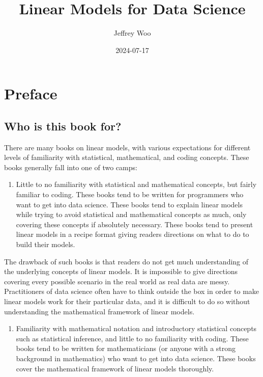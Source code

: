 \documentclass[
]{book}
\title{Linear Models for Data Science}
\author{Jeffrey Woo}
\date{2024-07-17}
\providecommand{\tightlist}{%
  \setlength{\itemsep}{0pt}\setlength{\parskip}{0pt}}
\begin{document}
\maketitle

{
\setcounter{tocdepth}{1}
\tableofcontents
}
\hypertarget{preface}{%
\chapter*{Preface}\label{preface}}

\hypertarget{who-is-this-book-for}{%
\section*{Who is this book for?}\label{who-is-this-book-for}}

There are many books on linear models, with various expectations for different levels of familiarity with statistical, mathematical, and coding concepts. These books generally fall into one of two camps:

\begin{enumerate}
\def\labelenumi{\arabic{enumi}.}
\tightlist
\item
  Little to no familiarity with statistical and mathematical concepts, but fairly familiar to coding. These books tend to be written for programmers who want to get into data science. These books tend to explain linear models while trying to avoid statistical and mathematical concepts as much, only covering these concepts if absolutely necessary. These books tend to present linear models in a recipe format giving readers directions on what to do to build their models.
\end{enumerate}

The drawback of such books is that readers do not get much understanding of the underlying concepts of linear models. It is impossible to give directions covering every possible scenario in the real world as real data are messy. Practitioners of data science often have to think outside the box in order to make linear models work for their particular data, and it is difficult to do so without understanding the mathematical framework of linear models.

\begin{enumerate}
\def\labelenumi{\arabic{enumi}.}
\setcounter{enumi}{1}
\tightlist
\item
  Familiarity with mathematical notation and introductory statistical concepts such as statistical inference, and little to no familiarity with coding. These books tend to be written for mathematicians (or anyone with a strong background in mathematics) who want to get into data science. These books cover the mathematical framework of linear models thoroughly.
\end{enumerate}
\end{document}
